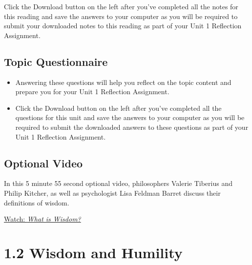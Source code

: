 \documentclass[
]{book}
\providecommand{\tightlist}{%
  \setlength{\itemsep}{0pt}\setlength{\parskip}{0pt}}
\begin{document}
\begin{reflect}
Click the Download button on the left after you've completed all the notes for this reading and save the answers to your computer as you will be required to submit your downloaded notes to this reading as part of your Unit 1 Reflection Assignment.
\end{reflect}

\hypertarget{topic-questionnaire}{%
\subsection*{Topic Questionnaire}\label{topic-questionnaire}}

\begin{reflect}
\begin{itemize}
\tightlist
\item
  Answering these questions will help you reflect on the topic content and prepare you for your Unit 1 Reflection Assignment.
\item
  Click the Download button on the left after you've completed all the questions for this unit and save the answers to your computer as you will be required to submit the downloaded answers to these questions as part of your Unit 1 Reflection Assignment.
\end{itemize}
\end{reflect}

\hypertarget{optional-video}{%
\subsection*{Optional Video}\label{optional-video}}

\begin{reflect}
In this 5 minute 55 second optional video, philosophers Valerie Tiberius and Philip Kitcher, as well as psychologist Lisa Feldman Barret discuss their definitions of wisdom.

\href{https://youtu.be/obqedyeUcwk}{Watch: \emph{What is Wisdom?}}
\end{reflect}

\hypertarget{wisdom-and-humility}{%
\section*{1.2 Wisdom and Humility}\label{wisdom-and-humility}}
\end{document}

